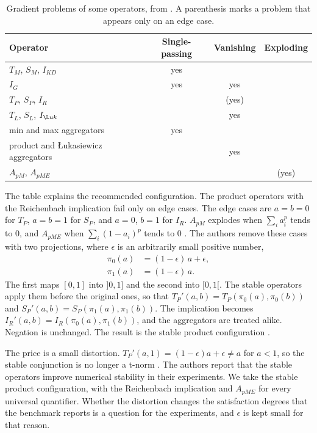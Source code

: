 \begin{table}[htbp]
\centering
\footnotesize
\caption{Gradient problems of some operators, from
\citet{badreddine2022ltn}. A parenthesis marks a problem that appears only on
an edge case.}
\label{tab:gradient-problems}
\begin{tabular}{@{}lccc@{}}
\toprule
Operator & Single-passing & Vanishing & Exploding \\
\midrule
$T_M$, $S_M$, $I_{KD}$ & yes & & \\
$I_G$ & yes & yes & \\
$T_P$, $S_P$, $I_R$ & & (yes) & \\
$T_L$, $S_L$, $I_{\L uk}$ & & yes & \\
min and max aggregators & yes & & \\
product and {\L}ukasiewicz aggregators & & yes & \\
$A_{pM}$, $A_{pME}$ & & & (yes) \\
\bottomrule
\end{tabular}
\end{table}

The table explains the recommended configuration. The product operators with
the Reichenbach implication fail only on edge cases. The edge cases are
$a=b=0$ for $T_P$, $a=b=1$ for $S_P$, and $a=0$, $b=1$ for $I_R$. $A_{pM}$
explodes when $\sum_i a_i^{p}$ tends to $0$, and $A_{pME}$ when
$\sum_i(1-a_i)^{p}$ tends to $0$ \citep{badreddine2022ltn}. The authors remove
these cases with two projections, where $\epsilon$ is an arbitrarily small
positive number,
\begin{align}
\pi_0(a) &= (1-\epsilon)\,a+\epsilon, \\
\pi_1(a) &= (1-\epsilon)\,a.
\end{align}
The first maps $[0,1]$ into $]0,1]$ and the second into $[0,1[$. The stable
operators apply them before the original ones, so that $T_P'(a,b)=
T_P(\pi_0(a),\pi_0(b))$ and $S_P'(a,b)=S_P(\pi_1(a),\pi_1(b))$. The
implication becomes $I_R'(a,b)=I_R(\pi_0(a),\pi_1(b))$, and the aggregators
are treated alike. Negation is unchanged. The result is the stable product
configuration \citep{badreddine2022ltn}.

The price is a small distortion. $T_P'(a,1)=(1-\epsilon)a+\epsilon\neq a$ for
$a<1$, so the stable conjunction is no longer a t-norm
\citep{badreddine2022ltn}. The authors report that the stable operators
improve numerical stability in their experiments. We take the stable product
configuration, with the Reichenbach implication and $A_{pME}$ for every
universal quantifier. Whether the distortion changes the satisfaction degrees
that the benchmark reports is a question for the experiments, and $\epsilon$ is
kept small for that reason.

